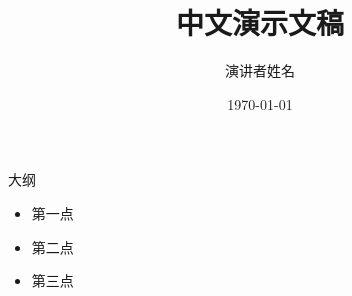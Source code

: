 \documentclass{beamer}
\title{中文演示文稿}
\author{演讲者姓名}
\date{\today}
\begin{document}
\begin{frame}
  \titlepage
\end{frame}

\begin{frame}{大纲}
  \begin{itemize}
    \item 第一点
    \item 第二点
    \item 第三点
  \end{itemize}
\end{frame}
\end{document}

